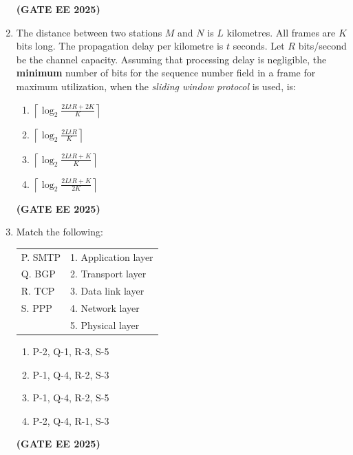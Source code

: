 \documentclass[journal,12pt,onecolumn]{IEEEtran}
\theoremstyle{remark}
\begin{document}
\begin{enumerate}
\begin{enumerate}
    \end{enumerate}
 \hfill \textbf{(GATE EE 2025)}
    \item The distance between two stations $M$ and $N$ is $L$ kilometres. All frames are $K$ bits long. The propagation delay per kilometre is $t$ seconds. Let $R$ bits/second be the channel capacity. Assuming that processing delay is negligible, the \textbf{minimum} number of bits for the sequence number field in a frame for maximum utilization, when the \textit{sliding window protocol} is used, is:  
    \begin{enumerate}
        \item $\left\lceil \log_2 \frac{2L t R + 2K}{K} \right\rceil$
        \item $\left\lceil \log_2 \frac{2L t R}{K} \right\rceil$
        \item $\left\lceil \log_2 \frac{2L t R + K}{K} \right\rceil$
        \item $\left\lceil \log_2 \frac{2L t R + K}{2K} \right\rceil$
    \end{enumerate}
\hfill \textbf{(GATE EE 2025)}
    \item Match the following:
    \newline
   
    \begin{tabular}{ll}
        P. SMTP & 1. Application layer \\
        Q. BGP & 2. Transport layer \\
        R. TCP & 3. Data link layer \\
        S. PPP & 4. Network layer \\
                & 5. Physical layer
    \end{tabular}
  

    \begin{enumerate}
        \item P-2, Q-1, R-3, S-5
        \item P-1, Q-4, R-2, S-3
        \item P-1, Q-4, R-2, S-5
        \item P-2, Q-4, R-1, S-3
    \end{enumerate}
    \hfill \textbf{(GATE EE 2025)}
\begin{center}
    

\end{center}
\end{enumerate}
\end{document}
